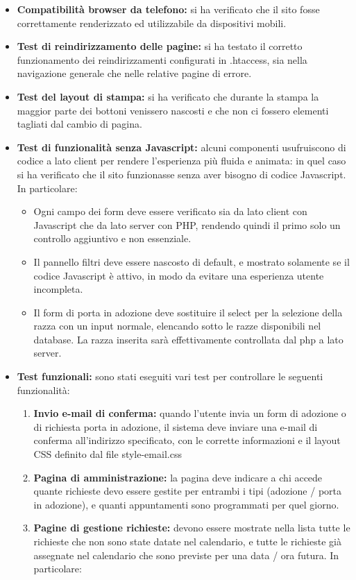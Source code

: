 \documentclass[a4paper,10pt]{article}
\begin{document}
\begin{itemize}
		\item \textbf{Compatibilità browser da telefono:} si ha verificato che il sito fosse correttamente renderizzato ed utilizzabile da dispositivi mobili.
		\item \textbf{Test di reindirizzamento delle pagine:} si ha testato il corretto funzionamento dei reindirizzamenti configurati in .htaccess, sia nella navigazione generale che nelle relative pagine di errore.
		\item \textbf{Test del layout di stampa:} si ha verificato che durante la stampa la maggior parte dei bottoni venissero nascosti e che non ci fossero elementi tagliati dal cambio di pagina.
		\item \textbf{Test di funzionalità senza Javascript:} alcuni componenti usufruiscono di codice a lato client per rendere l'esperienza più fluida e animata: in quel caso si ha verificato che il sito funzionasse senza aver bisogno di codice Javascript. In particolare:
		\begin{itemize}
			\item Ogni campo dei form deve essere verificato sia da lato client con Javascript che da lato server con PHP, rendendo quindi il primo solo un controllo aggiuntivo e non essenziale.
			\item Il pannello filtri deve essere nascosto di default, e mostrato solamente se il codice Javascript è attivo, in modo da evitare una esperienza utente incompleta.
			\item Il form di porta in adozione deve sostituire il select per la selezione della razza con un input normale, elencando sotto le razze disponibili nel database. La razza inserita sarà effettivamente controllata dal php a lato server.
		\end{itemize}
		\item \textbf{Test funzionali:} sono stati eseguiti vari test per controllare le seguenti funzionalità:
		\begin{enumerate}
			\item \textbf{Invio e-mail di conferma:} quando l'utente invia un form di adozione o di richiesta porta in adozione, il sistema deve inviare una e-mail di conferma all'indirizzo specificato, con le corrette informazioni e il layout CSS definito dal file style-email.css
			\item \textbf{Pagina di amministrazione:} la pagina deve indicare a chi accede quante richieste devo essere gestite per entrambi i tipi (adozione / porta in adozione), e quanti appuntamenti sono programmati per quel giorno.
			\item \textbf{Pagine di gestione richieste:} devono essere mostrate nella lista tutte le richieste che non sono state datate nel calendario, e tutte le richieste già assegnate nel calendario che sono previste per una data / ora futura. In particolare:

\end{enumerate}
\end{itemize}
\end{document}
